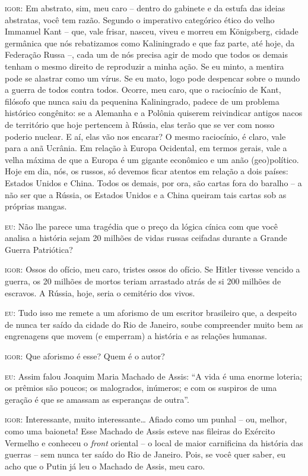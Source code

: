\textsc{igor:} Em abstrato, sim, meu caro -- dentro do gabinete e da
estufa das ideias abstratas, você tem razão. Segundo o imperativo
categórico ético do velho Immanuel Kant -- que, vale frisar, nasceu,
viveu e morreu em Königsberg, cidade germânica que nós rebatizamos como
Kaliningrado e que faz parte, até hoje, da Federação Russa --, cada um
de nós precisa agir de modo que todos os demais tenham o mesmo direito
de reproduzir a minha ação. Se eu minto, a mentira pode se alastrar como
um vírus. Se eu mato, logo pode despencar sobre o mundo a guerra de
todos contra todos. Ocorre, meu caro, que o raciocínio de Kant, filósofo
que nunca saiu da pequenina Kaliningrado, padece de um problema
histórico congênito: se a Alemanha e a Polônia quiserem reivindicar
antigos nacos de território que hoje pertencem à Rússia, elas terão que
se ver com nosso poderio nuclear. E aí, elas vão nos encarar? O mesmo
raciocínio, é claro, vale para a anã Ucrânia. Em relação à Europa
Ocidental, em termos gerais, vale a velha máxima de que a Europa é um
gigante econômico e um anão (geo)político. Hoje em dia, nós, os russos,
só devemos ficar atentos em relação a dois países: Estados Unidos e
China. Todos os demais, por ora, são cartas fora do baralho -- a não ser
que a Rússia, os Estados Unidos e a China queiram tais cartas sob as
próprias mangas.

\textsc{eu:} Não lhe parece uma tragédia que o preço da lógica cínica
com que você analisa a história sejam 20 milhões de vidas russas
ceifadas durante a Grande Guerra Patriótica?

\textsc{igor:} Ossos do ofício, meu caro, tristes ossos do ofício. Se
Hitler tivesse vencido a guerra, os 20 milhões de mortos teriam
arrastado atrás de si 200 milhões de escravos. A Rússia, hoje, seria o
cemitério dos vivos.

\textsc{eu:} Tudo isso me remete a um aforismo de um escritor brasileiro
que, a despeito de nunca ter saído da cidade do Rio de Janeiro, soube
compreender muito bem as engrenagens que movem (e emperram) a história e
as relações humanas.

\textsc{igor:} Que aforismo é esse? Quem é o autor?

\textsc{eu:} Assim falou Joaquim Maria Machado de Assis: ``A vida é uma
enorme loteria; os prêmios são poucos; os malogrados, inúmeros; e com os
suspiros de uma geração é que se amassam as esperanças de outra''.

\textsc{igor:} Interessante, muito interessante\ldots{} Afiado como um punhal
-- ou, melhor, como uma baioneta! Esse Machado de Assis esteve nas
fileiras do Exército Vermelho e conheceu o \emph{front} oriental -- o
local de maior carnificina da história das guerras -- sem nunca ter
saído do Rio de Janeiro. Pois, se você quer saber, eu acho que o Putin
já leu o Machado de Assis, meu caro.

